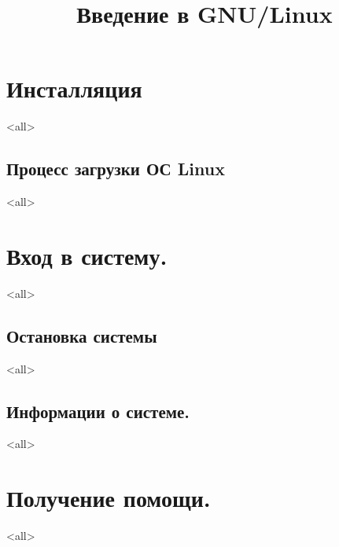 

\title{Введение в GNU/Linux}




\begin{frame}
	\frametitle{}
	\titlepage
	\vspace{-0.5cm}
	\begin{center}
	\end{center}
\end{frame}


\begin{frame}
	\tableofcontents
	[hideallsubsections]
\end{frame}


\section{Инсталляция}
\mode<all>{}
\subsection{Процесс загрузки ОС Linux}
\mode<all>{}

\section{Вход в систему.}
\mode<all>{}
\subsection{Остановка системы}
\mode<all>{}
\subsection{Информации о системе.}
\mode<all>{}

\section{Получение помощи.}
\mode<all>{}

